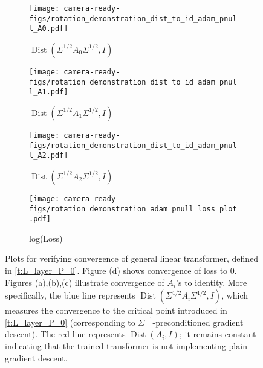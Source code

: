 \documentclass{article}
\DeclareMathOperator{\Dist}{Dist}
\begin{document}
\begin{figure}[h]
\centering
\begin{subfigure}{0.24\textwidth}
\centering
\texttt{[image: camera-ready-figs/rotation\_demonstration\_dist\_to\_id\_adam\_pnull\_A0.pdf]} %
\caption{$\Dist(\Sigma^{1/2} A_0 \Sigma^{1/2},I)$}
\label{fig:A0_pnull_trend}
\end{subfigure}\hfill
\begin{subfigure}{0.24\textwidth}
\centering
\texttt{[image: camera-ready-figs/rotation\_demonstration\_dist\_to\_id\_adam\_pnull\_A1.pdf]}  %
\caption{$\Dist(\Sigma^{1/2} A_1 \Sigma^{1/2},I)$}
\label{fig:A1_pnull_trend}
\end{subfigure}
\begin{subfigure}{0.24\textwidth}
\centering
\texttt{[image: camera-ready-figs/rotation\_demonstration\_dist\_to\_id\_adam\_pnull\_A2.pdf]}  %
\caption{$\Dist(\Sigma^{1/2} A_2 \Sigma^{1/2},I)$}
\label{fig:A2_pnull_trend}
\end{subfigure}
\begin{subfigure}{0.24\textwidth}
\centering
\texttt{[image: camera-ready-figs/rotation\_demonstration\_adam\_pnull\_loss\_plot.pdf]}  %
\caption{log(Loss)}
\label{fig:loss_pnull}
\end{subfigure}
\caption{Plots for verifying convergence of general linear transformer, defined in \autoref{t:L_layer_P_0}. Figure (d) shows convergence of loss to $0$. Figures (a),(b),(c) illustrate convergence of $A_i$'s to identity. More specifically,  the blue line represents $\Dist(\Sigma^{1/2} A_i \Sigma^{1/2},I)$,  which measures the convergence to the critical point introduced in \autoref{t:L_layer_P_0} (corresponding to $\Sigma^{-1}$-preconditioned gradient descent). The red line  represents $\Dist(A_i,I)$; it remains constant indicating that the trained transformer is not implementing plain gradient descent. }

\label{fig:pnull_trend}
\end{figure}
\end{document}
